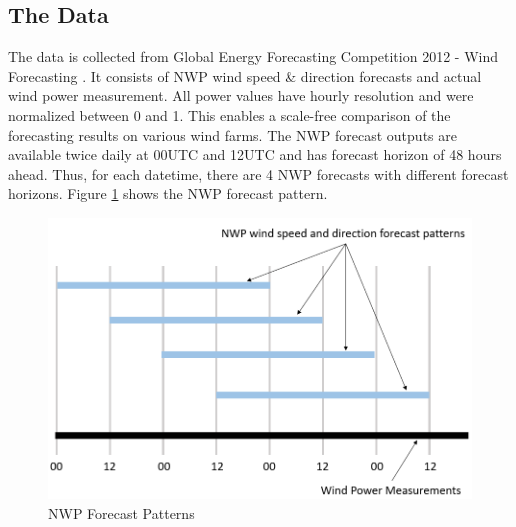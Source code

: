 \documentclass[conference]{IEEEtran}
\begin{document}
\subsection{The Data}
The data is collected from Global Energy Forecasting Competition 2012 - Wind Forecasting \cite{HONG2014357}. It consists of NWP wind speed \& direction forecasts and actual wind power measurement. %
All power values have hourly resolution and were normalized between 0 and 1. This enables a scale-free comparison of the forecasting results on various wind farms. The NWP forecast outputs are available twice daily at 00UTC and 12UTC and has forecast horizon of 48 hours ahead. Thus, for each datetime, there are 4 NWP forecasts with different forecast horizons. Figure \ref{fig:pattern} shows the NWP forecast pattern.

\begin{figure}
\centering
\includegraphics[width=0.7\columnwidth]{FIG/pattern}
\caption{NWP Forecast Patterns}
\label{fig:pattern}
\vspace*{-5mm}
\end{figure}
\end{document}
